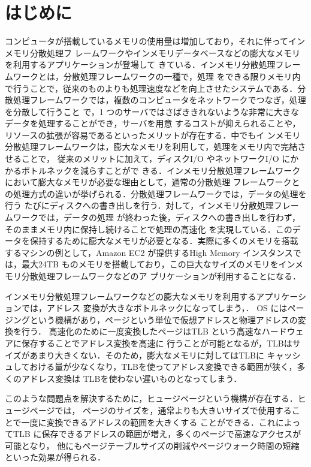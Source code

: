 \section{はじめに} \label{section:introduction}
コンピュータが搭載しているメモリの使用量は増加しており，それに伴ってインメモリ分散処理フ
レームワークやインメモリデータベースなどの膨大なメモリを利用するアプリケーションが登場して
きている．インメモリ分散処理フレームワーク\cite{zaharia2010spark}とは，分散処理フレームワーク\cite{dean2008mapreduce}の一種で，処理
をできる限りメモリ内で行うことで，従来のものよりも処理速度などを向上させたシステムである．分
散処理フレームワークでは，複数のコンピュータをネットワークでつなぎ，処理を分散して行うこと
で，1 つのサーバではさばききれないような非常に大きなデータを処理することができ，サーバを用意
するコストが抑えられることや，リソースの拡張が容易であるといったメリットが存在する．中でもイ
ンメモリ分散処理フレームワークは，膨大なメモリを利用して，処理をメモリ内で完結させることで，
従来のメリットに加えて，ディスクI/O やネットワークI/O にかかるボトルネックを減らすことがで
きる．インメモリ分散処理フレームワークにおいて膨大なメモリが必要な理由として，通常の分散処理
フレームワークとの処理方式の違いが挙げられる．分散処理フレームワークでは，データの処理を行う
たびにディスクへの書き出しを行う．対して，インメモリ分散処理フレームワークでは，データの処理
が終わった後，ディスクへの書き出しを行わず，そのままメモリ内に保持し続けることで処理の高速化
を実現している．このデータを保持するために膨大なメモリが必要となる．実際に多くのメモリを搭載
するマシンの例として，Amazon EC2 が提供するHigh Memory インスタンス\cite{amazon-ec2-high-memory}では，最大24TB
ものメモリを搭載しており，この巨大なサイズのメモリをインメモリ分散処理フレームワークなどのア
プリケーションが利用することになる．

インメモリ分散処理フレームワークなどの膨大なメモリを利用するアプリケーションでは，アドレス
変換が大きなボトルネックになってしまう\cite{basu2013efficient}，\cite{gandhi2014efficient}．
OS にはページングという機構があり，ページという単位で仮想アドレスと物理アドレスの変換を行う．
高速化のために一度変換したページはTLB という高速なハードウェアに保存することでアドレス変換を高速に
行うことが可能となるが，TLBはサイズがあまり大きくない．そのため，膨大なメモリに対してはTLBに
キャッシュしておける量が少なくなり，TLBを使ってアドレス変換できる範囲が狭く，多くのアドレス変換は
TLBを使わない遅いものとなってしまう．

このような問題点を解決するために，ヒュージページという機構が存在する．ヒュージページでは，
ページのサイズを，通常よりも大きいサイズで使用することで一度に変換できるアドレスの範囲を大きくする
ことができる．これによってTLB に保存できるアドレスの範囲が増え，多くのページで高速なアクセスが可能となり，
他にもページテーブルサイズの削減やページウォーク時間の短縮といった効果が得られる．

